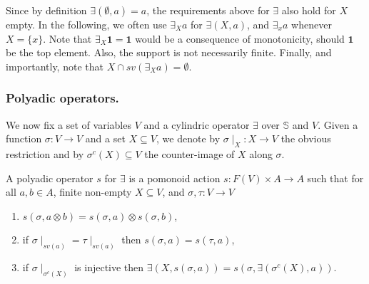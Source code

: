 \documentclass{llncs}
\def\monid{{\mathbf 0}}
\def\monop{\otimes}
\def\monid{\mathbf{1}}
\begin{document}
Since by definition $\exists(\emptyset, a) = a$, the requirements above for $\exists$ also hold for $X$ empty.
%
%
%
In the following, we often use $\exists_X a$ for $\exists(X, a)$, and $\exists_x a$ whenever $X = \{x\}$.
%
Note that $\exists_X \monid = \monid$ would be a consequence of monotonicity,
should $\monid$ be the top element. Also, the support is not necessarily finite.
Finally, and importantly, note that 
$X \cap sv(\exists_X a) = \emptyset$.

\subsubsection{Polyadic operators.}
We now fix a set of variables $V$ and a cylindric operator $\exists$ over ${\mathbb S}$ and $V$.
Given a function $\sigma: V \rightarrow V$ and a set $X \subseteq V$, we denote by 
$\sigma \mid_{X}: X \rightarrow V$ the obvious restriction and
by $\sigma^{c}(X) \subseteq V$ the counter-image of $X$ along $\sigma$.


\begin{definition}[Polyadification]
	\label{def:poly}
	A polyadic operator $s$ for $\exists$ is a pomonoid action $s: F(V) \times A \rightarrow A$
	such that for all $a, b \in A$, finite non-empty $X \subseteq V$, and $\sigma, \tau: V \rightarrow V$
	\begin{enumerate}
	\item $s(\sigma, a \monop b) = s(\sigma, a) \monop s(\sigma, b)$,
        \item if $\sigma \mid_{sv(a)} = \tau \mid_{sv(a)}$ then $s(\sigma, a) = s(\tau, a)$,
        \item if $\sigma \mid_{\sigma^{c}(X)}$ is injective then $\exists(X, s(\sigma, a)) = s(\sigma, \exists(\sigma^{c}(X), a))$.
        \end{enumerate}
\end{definition}
\end{document}
